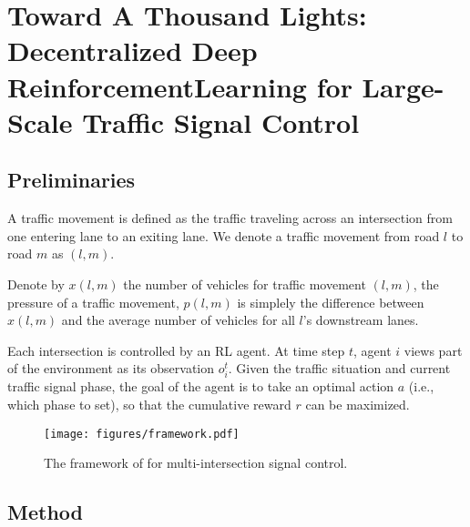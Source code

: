\chapter{Toward A Thousand Lights: Decentralized Deep ReinforcementLearning for Large-Scale Traffic Signal Control}
\label{chap:thousand}

\section{Preliminaries}
 
\begin{definition}
A traffic movement is defined as the traffic traveling across an intersection from one entering lane to an exiting lane. We denote a traffic movement from road $l$ to road $m$ as $(l,m)$. 
\end{definition}

\begin{definition}
Denote by $x(l,m)$ the number of vehicles for traffic movement $(l,m)$, the pressure of a traffic movement, $p(l,m)$ is simplely the difference between $x(l,m)$ and the average number of vehicles for all $l$'s downstream lanes.
    \end{definition}


\begin{problem}
Each intersection is controlled by an RL agent. At time step $t$, agent $i$ views part of the environment as its observation $o^t_i$. Given the traffic situation and current traffic signal phase, the goal of the agent is to take an optimal action $a$ (i.e., which phase to set), so that the cumulative reward $r$ can be maximized. 
\end{problem}

\begin{figure}[t!]
\centering
\texttt{[image: figures/framework.pdf]}
\caption{The framework of \PressLight for multi-intersection signal control.}%
\label{fig:framework}
\end{figure}


\section{Method}


